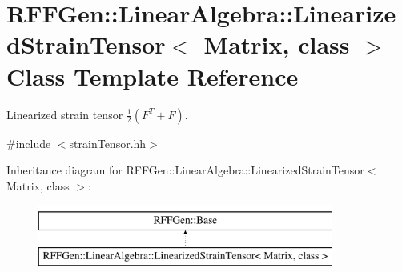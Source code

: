 \hypertarget{classRFFGen_1_1LinearAlgebra_1_1LinearizedStrainTensor}{\section{R\-F\-F\-Gen\-:\-:Linear\-Algebra\-:\-:Linearized\-Strain\-Tensor$<$ Matrix, class $>$ Class Template Reference}
\label{classRFFGen_1_1LinearAlgebra_1_1LinearizedStrainTensor}
}


Linearized strain tensor $ \frac{1}{2}\left(F^T+F\right) $.  




{\ttfamily \#include $<$strain\-Tensor.\-hh$>$}

Inheritance diagram for R\-F\-F\-Gen\-:\-:Linear\-Algebra\-:\-:Linearized\-Strain\-Tensor$<$ Matrix, class $>$\-:\begin{figure}[H]
\begin{center}
\leavevmode
\includegraphics[height=2.000000cm]{classRFFGen_1_1LinearAlgebra_1_1LinearizedStrainTensor}
\end{center}
\end{figure}
